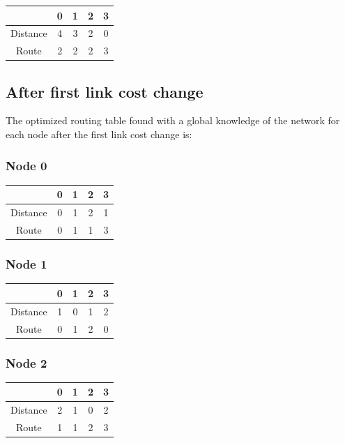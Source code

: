 \documentclass[a4paper,11pt,final]{report}
\begin{document}
\begin{tabular}{|c|c|c|c|c|}
\hline
& 0 & 1 & 2 & 3 \\ \hline
Distance & 4 & 3 & 2 & 0 \\ \hline
Route & 2 & 2 & 2 & 3 \\ \hline
\end{tabular}

\subsection{After first link cost change}

The optimized routing table found with a global knowledge of the network
for each node after the first link cost change is:

\subsubsection{Node 0}

\begin{tabular}{|c|c|c|c|c|}
\hline
& 0 & 1 & 2 & 3 \\ \hline
Distance & 0 & 1 & 2 & 1 \\ \hline
Route & 0 & 1 & 1 & 3 \\ \hline
\end{tabular}

\subsubsection{Node 1}

\begin{tabular}{|c|c|c|c|c|}
\hline
& 0 & 1 & 2 & 3 \\ \hline
Distance & 1 & 0 & 1 & 2 \\ \hline
Route & 0 & 1 & 2 & 0 \\ \hline
\end{tabular}

\subsubsection{Node 2}

\begin{tabular}{|c|c|c|c|c|}
\hline
& 0 & 1 & 2 & 3 \\ \hline
Distance & 2 & 1 & 0 & 2 \\ \hline
Route & 1 & 1 & 2 & 3 \\ \hline
\end{tabular}
\end{document}
